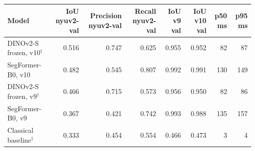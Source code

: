 \begin{tabular}{@{}lrrrrrrr@{}}
\toprule
Model & IoU nyuv2-val & Precision nyuv2-val & Recall nyuv2-val & IoU v9 val & IoU v10 val & p50 ms & p95 ms \\
\midrule
DINOv2-S frozen, v10$^\dagger$ & 0.516 & 0.747 & 0.625 & 0.955 & 0.952 & 82 & 87 \\
SegFormer-B0, v10 & 0.482 & 0.545 & 0.807 & 0.992 & 0.991 & 130 & 149 \\
DINOv2-S frozen, v9$^\dagger$ & 0.466 & 0.715 & 0.573 & 0.956 & 0.950 & 82 & 86 \\
SegFormer-B0, v9 & 0.367 & 0.421 & 0.742 & 0.993 & 0.988 & 135 & 157 \\
Classical baseline$^\dagger$ & 0.333 & 0.454 & 0.554 & 0.466 & 0.473 & 3 & 4 \\
\bottomrule
\end{tabular}
